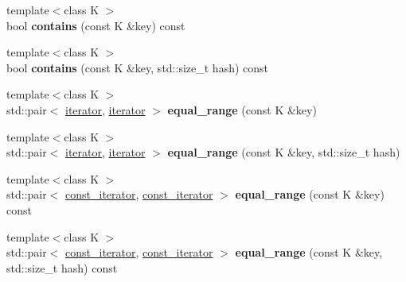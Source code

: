 \begin{DoxyCompactItemize}
{\footnotesize template$<$class K $>$ }\\bool {\bfseries contains} (const K \&key) const
\item 
\mbox{\label{classtsl_1_1detail__robin__hash_1_1robin__hash_a6c06b6e22caea7cc1fb84084f076fd8b}} 
{\footnotesize template$<$class K $>$ }\\bool {\bfseries contains} (const K \&key, std\+::size\+\_\+t hash) const
\item 
\mbox{\label{classtsl_1_1detail__robin__hash_1_1robin__hash_a356fd39b766aec21d31be63e55bc3d71}} 
{\footnotesize template$<$class K $>$ }\\std\+::pair$<$ \mbox{\hyperlink{classtsl_1_1detail__robin__hash_1_1robin__hash_1_1robin__iterator}{iterator}}, \mbox{\hyperlink{classtsl_1_1detail__robin__hash_1_1robin__hash_1_1robin__iterator}{iterator}} $>$ {\bfseries equal\+\_\+range} (const K \&key)
\item 
\mbox{\label{classtsl_1_1detail__robin__hash_1_1robin__hash_a83afff6b92f5b1d14223ec98c3cda5a1}} 
{\footnotesize template$<$class K $>$ }\\std\+::pair$<$ \mbox{\hyperlink{classtsl_1_1detail__robin__hash_1_1robin__hash_1_1robin__iterator}{iterator}}, \mbox{\hyperlink{classtsl_1_1detail__robin__hash_1_1robin__hash_1_1robin__iterator}{iterator}} $>$ {\bfseries equal\+\_\+range} (const K \&key, std\+::size\+\_\+t hash)
\item 
\mbox{\label{classtsl_1_1detail__robin__hash_1_1robin__hash_a77efb6417303f1ca390904e5f003cfec}} 
{\footnotesize template$<$class K $>$ }\\std\+::pair$<$ \mbox{\hyperlink{classtsl_1_1detail__robin__hash_1_1robin__hash_1_1robin__iterator}{const\+\_\+iterator}}, \mbox{\hyperlink{classtsl_1_1detail__robin__hash_1_1robin__hash_1_1robin__iterator}{const\+\_\+iterator}} $>$ {\bfseries equal\+\_\+range} (const K \&key) const
\item 
\mbox{\label{classtsl_1_1detail__robin__hash_1_1robin__hash_a80ab3bc3ec9afc41dfbf28b21169fb7f}} 
{\footnotesize template$<$class K $>$ }\\std\+::pair$<$ \mbox{\hyperlink{classtsl_1_1detail__robin__hash_1_1robin__hash_1_1robin__iterator}{const\+\_\+iterator}}, \mbox{\hyperlink{classtsl_1_1detail__robin__hash_1_1robin__hash_1_1robin__iterator}{const\+\_\+iterator}} $>$ {\bfseries equal\+\_\+range} (const K \&key, std\+::size\+\_\+t hash) const

\end{DoxyCompactItemize}
